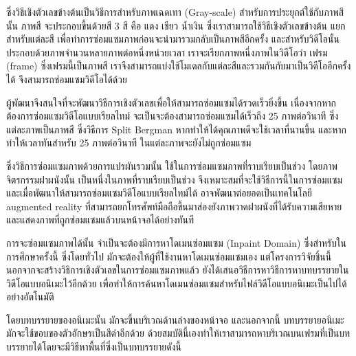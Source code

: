\documentclass[hidelinks,a4paper,14pt]{article}
\numberwithin{equation}{section}							%
\begin{document}
{		ซึ่งวิธีเชิงตัวเลขข้างต้นเป็นวิธีการสำหรับภาพเฉดเทา (Gray-scale) สำหรับการประยุกต์ใช้กับภาพสีนั้น ภาพสี จะประกอบขึ้นด้วยสี  3 สี คือ แดง เขียว น้ำเงิน ซึ่งเราสามารถใช้วิธีเชิงตัวเลขข้างต้น แยกสำหรับแต่ละสี เพื่อทำการซ่อมแซมภาพก่อนจะนำมารวมกลับเป็นภาพสีอีกครั้ง และสำหรับวิดีโอนั้นประกอบด้วยภาพจำนวนหลายภาพต่อหนึ่งหน่วยเวลา เราจะเรียกภาพหนึ่งภาพในวิดีโอว่า เฟรม (frame) ซึ่งเฟรมนี้เป็นภาพสี เราจึงสามารถแบ่งใช้โมเดลกับแต่ละสีและรวมกันกับมาเป็นวิดีโออีกครั้งได้ จึงสามารถซ่อมแซมวิดีโอได้ด้วย
	
		
		ผู้พัฒนาจึงสนใจที่จะพัฒนาวิธีการเชิงตัวเลขเพื่อให้สามารถซ่อมแซมได้รวดเร็วยิ่งขึ้น เนื่องจากหากต้องการซ่อมแซมวิดีโอแบบเรียลไทม์ จะเป็นจะต้องสามารถซ่อมแซมได้เร็วถึง 25 ภาพต่อวินาที ซึ่งแต่ละภาพเป็นภาพสี ซึ่งวิธีการ Split Bergman หากทำให้ได้คุณภาพดีจะใช้เวลาที่นานขึ้น และหากทำให้เวลาทันสำหรับ 25 ภาพต่อวินาที ในแต่ละภาพจะยังไม่ถูกซ่อมแซม
		
		
		
		ซึ่งวิธีการซ่อมแซมภาพด้วยการแปรผันรวมนั้น ใช้ในการซ่อมแซมภาพที่ราบเรียบเป็นช่วง โดยภาพจิตรกรรมฝาผนังนั้น เป็นหนึ่งในภาพที่ราบเรียบเป็นช่วง จึงเหมาะสมที่จะใช้วิธีการนี้ในการซ่อมแซม และเมื่อพัฒนาให้สามารถซ่อมแซมวิดีโอแบบเรียลไทม์ได้ อาจพัฒนาต่อยอดเป็นเทคโนโลยี augmented reality ที่สามารถยกโทรศัพท์มือถือขึ้นมาส่องยังภาพวาดฝาผนังที่ได้รับความเสียหายและแสดงภาพที่ถูกซ่อมแซมแล้วบนหน้าจอได้อย่างทันที
		
		
		การจะซ่อมแซมภาพได้นั้น จำเป็นจะต้องมีการหาโดเมนซ่อมแซม (Inpaint Domain) ซึ่งสำหรับในการศึกษาครั้งนี้ ซึ่งโดยทั่วไป มักจะต้องให้ผู้ที่ใช้งานหาโดเมนซ่อมแซมเอง แต่โครงการวิจัยชิ้นนี้นอกจากจะสร้างวิธิการเชิงตัวเลขในการซ่อมแซมภาพแล้ว ยังได้เสนอวิธีการหาวิธีการหาบทบรรยายในวิดีโอแบบอนิเมะไว้อีกด้วย เพื่อทำให้การค้นหาโดเมนซ่อมแซมสำหรับไฟล์วิดีโอแบบอนิเมะเป็นไปได้อย่างอัตโนมัติ
		
		โดยบทบรรยายของอนิเมะนั้น มักจะขึ้นบริเวณด้านล่างของหน้าจอ และนอกจากนี้ บทบรรยายอนิเมะมักจะใช้ขอบของตัวอักษรเป็นสีดำอีกด้วย ด้วยสมบัตินี้เองทำให้เราสามารถหาบริเวณบนเฟรมที่เป็นบทบรรยายได้โดยจะมีวิธีหาพื้นที่ซึ่งเป็นบทบรรยายดังนี้
		
}
\end{document}
